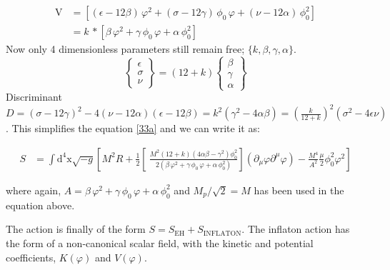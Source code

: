 \documentclass[aps,prd,reprint,preprintnumbers,showpacs,floatfix,nofootinbib,superscript address]{revtex4-2}
\begin{document}
\[
\begin{split}
\text{V} &= \left[(\epsilon - 12\beta)\,\varphi^2 + (\sigma - 12\gamma)\,\phi_0\,\varphi + (\nu - 12\alpha)\,\phi_0^2\right] \\
         &= k\,*\left[\beta\,\varphi^2 + \gamma\,\phi_0\,\varphi + \alpha\,\phi_0^2\right]
\end{split}
\]
Now only 4 dimensionless parameters still remain free; $\{k, \beta, \gamma, \alpha \}$.
\begin{equation} \label{Variable Dictionary}
    \begin{Bmatrix}
        \epsilon \\ \sigma \\ \nu 
    \end{Bmatrix}
    = (12+k)
    \begin{Bmatrix}
        \beta \\ \gamma \\ \alpha
    \end{Bmatrix}
\end{equation}
Discriminant $D = (\sigma -12 \gamma )^2-4 (\nu -12 \alpha ) (\epsilon -12 \beta ) = k^2 (\gamma^2 - 4\alpha \beta) = (\frac{k}{12+k})^2 (\sigma^2 -4 \epsilon \nu)$. This simplifies the equation \ref{33a} and we can write it as:
\begin{widetext}
    \begin{equation} 
    \begin{aligned}
        S &= \int \text{d}^4\text{x} \sqrt{-g} [ M^2 R + \frac{1}{2} \left[\ \frac{M^2(12+k)(4\alpha\beta-\gamma^2) \phi_0^2}{2(\beta\,\varphi^2 + \gamma\,\phi_0\,\varphi + \alpha\,\phi_0^2)} \right] (\partial_\mu \varphi \partial^\mu \varphi) -  \frac{M^4}{A^2} \frac{\mu}{2} \phi^2_0 \varphi^2 ] 
    \end{aligned}
\end{equation}
\end{widetext}
where again, $A =\beta\,\varphi^2 + \gamma\,\phi_0\,\varphi + \alpha\,\phi_0^2$ and $M_p/\sqrt{2} = M$ has been used in the equation above.

The action is finally of the form $S = S_{\text{EH}} + S_{\text{INFLATON}}$. The inflaton action has the form of a non-canonical scalar field, with the kinetic and potential coefficients, $K(\varphi)$ and $V(\varphi)$.
\end{document}
